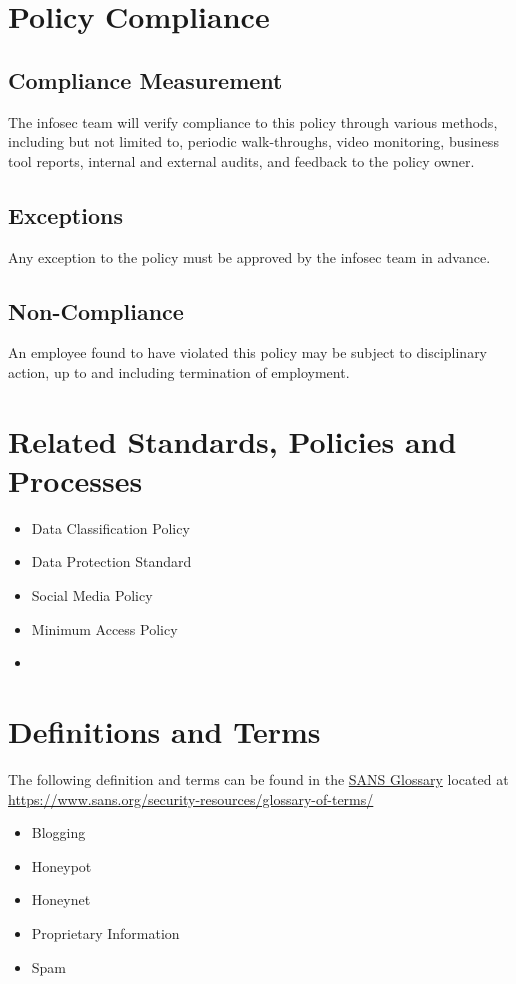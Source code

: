 \section{Policy Compliance}
\subsection{Compliance Measurement}
The \gls{infosec} team will verify compliance to this policy through various methods, including but not limited to, periodic walk-throughs, video monitoring, business tool reports, internal and external audits, and feedback to the policy owner.
\subsection{Exceptions}\label{G:AUP:PC:E}
Any exception to the policy must be approved by the \gls{infosec} team in advance.
\subsection{Non-Compliance}
An employee found to have violated this policy may be subject to disciplinary action, up to and including termination of employment.

\section{Related Standards, Policies and Processes}
\begin{itemize}
\item Data Classification Policy
\item Data Protection Standard
\item Social Media Policy
\item Minimum Access Policy
\item {}
\end{itemize}


\section{Definitions and Terms}
The following definition and terms can be found in the \href{https://www.sans.org/security-resources/glossary-of-terms/}{SANS Glossary} located at \url{https://www.sans.org/security-resources/glossary-of-terms/}
\begin{itemize}
\item Blogging
\item Honeypot
\item Honeynet
\item Proprietary Information
\item Spam
\end{itemize}

\CommonRevisionHistory